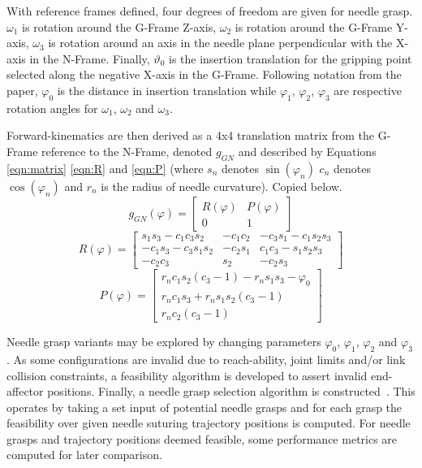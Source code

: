 \documentclass[english]{sobraep}
\begin{document}
With reference frames defined, four degrees of freedom are given for needle grasp. $\omega_{1}$ is rotation around the G-Frame Z-axis, $\omega_{2}$ is rotation around the G-Frame Y-axis, $\omega_{3}$ is rotation around an axis in the needle plane perpendicular with the X-axis in the N-Frame. Finally, $\vartheta_{0}$ is the insertion translation for the gripping point selected along the negative X-axis in the G-Frame. Following notation from the paper, $\varphi_0$ is the distance in insertion translation while $\varphi_1$, $\varphi_2$, $\varphi_3$ are respective rotation angles for $\omega_{1}$, $\omega_{2}$ and $\omega_{3}$. 

Forward-kinematics are then derived as a 4x4 translation matrix from the G-Frame reference to the N-Frame, denoted $g_{GN}$ and described by Equations \ref{eqn:matrix} \ref{eqn:R} and \ref{eqn:P} (where $s_n$ denotes $\sin(\varphi_n)$ $c_n$ denotes $\cos(\varphi_n)$ and $r_n$ is the radius of needle curvature). Copied below.
\begin{equation}
    g_{GN}(\varphi) = 
      \begin{bmatrix}
      R(\varphi) & P(\varphi)\\
      0 & 1
      \end{bmatrix}
      \label{eqn:matrix}
\end{equation}
\begin{equation}
    R(\varphi) =  
    \begin{bmatrix}
    s_1 s_3 - c_1 c_3 s_2 & - c_1 c_2 & - c_3 s_1 - c_1 s_2 s_3 \\
    -c_1 s_3 - c_3 s_1 s_2 & - c_2 s_1 & c_1 c_3 - s_1 s_2 s_3 \\
    -c_2 c_3 & s_2 & -c_2 s_3
    \end{bmatrix}
    \label{eqn:R}
\end{equation}
\begin{equation}
    P(\varphi) = 
    \begin{bmatrix}
    r_n c_1 s_2 (c_3 - 1)-r_n s_1 s_3 - \varphi_0\\
    r_n c_1 s_3 + r_n s_1 s_2 (c_3 - 1)\\
    r_n c_2 (c_3 - 1)
    \end{bmatrix}
    \label{eqn:P}
\end{equation}

Needle grasp variants may be explored by changing parameters $\varphi_0$, $\varphi_1$, $\varphi_2$ and $\varphi_3$. As some configurations are invalid due to reach-ability, joint limits and/or link collision constraints, a feasibility algorithm is developed to assert invalid end-affector positions. Finally, a needle grasp selection algorithm is constructed~\cite[Algorithm 1]{needle-grasp}. This operates by taking a set input of potential needle grasps and for each grasp the feasibility over given needle suturing trajectory positions is computed. For needle grasps and trajectory positions deemed feasible, some performance metrics are computed for later comparison.
\end{document}
